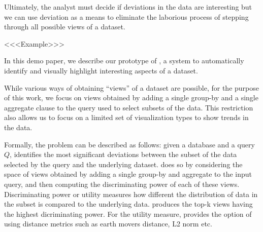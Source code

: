 Ultimately, the analyst must decide if deviations in the data are interesting
but we can use deviation as a means to eliminate the laborious process
of stepping through all possible views of a dataset. 

<<<Example>>>

In this demo paper, we describe our prototype of \SeeDB, a system to
automatically identify and visually highlight interesting aspects of a dataset. 

While various ways of obtaining ``views'' of a dataset are possible, for the
purpose of this work, we focus on views obtained by adding a single group-by and
a single aggregate clause to the query used to select subsets of the data. This
restriction also allows us to focus on a limited set of visualization types to
show trends in the data.

Formally, the problem can be described as follows: given a database and a query
$Q$, \SeeDB identifies the most significant deviations between the subset of the
data selected by the query and the underlying dataset. \SeeDB does so by
considering the space of views obtained by adding a single group-by and
aggregate to the input query, and then computing the discriminating power of
each of these views. Discriminating power or utility measures how different the
distribution of data in the subset is compared to the underlying data. \SeeDB
produces the top-k views having the highest dicriminating power. For the utility
measure, \SeeDB provides the option of using distance metrics such as earth
movers distance, L2 norm etc.


